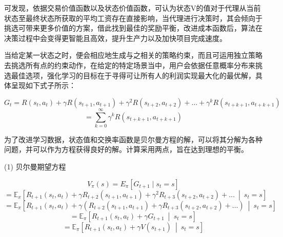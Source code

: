 可发现，依据交易价值函数以及状态价值函数，可认为状态V的值对于代理从当前状态至最终状态所获取的平均工资存在直接影响，当代理进行决策时，其会倾向于挑选可带来更多价值的方案，借此找到最佳的奖励平衡，改进成本函数后，算法在决策过程中会变得更智能且高效，提升生产力以及加快项目完成速度。

当给定某一状态之时，便会相应地生成与之相关的策略约束，而且可运用独立策略去挑选所有点的约束动作，在给定的特定场景当中，用户会依据任意概率分布来挑选最佳选项，强化学习的目标在于寻得可让所有人的利润实现最大化的最优解，具体呈现如下式子所示：

\begin{equation}
G_t = R(s_t, a_t) + \gamma R(s_{t+1}, a_{t+1}) + \gamma^2 R(s_{t+2}, a_{t+2}) + \ldots + \gamma^k R(s_{t+k+1}, a_{t+k+1})
\end{equation}
\begin{equation}
= \sum_{k=0}^\infty \gamma^k R(s_{t+k+1}, a_{t+k+1})
\end{equation}


为了改进学习数据，状态值和交换率函数是贝尔曼方程的解，可以将其分解为各种问题，并可以作为方程获得良好的解\cite{franccois2018introduction}。计算采用两点，旨在达到理想的平衡。

(1) 贝尔曼期望方程

\begin{equation}
V_{\pi}(s) = E_{\pi} \left[ G_{t+1} \mid s_{t} = s \right]
\end{equation}
\begin{equation}
= \mathbb{E}_x \left[ R_{t+1}(s_t, a_t) + \gamma R_{t+2}(s_{t+1}, a_{t+1}) + \gamma^2 R_{t+3}(s_{t+2}, a_{t+2}) + \ldots \ \middle| \ s_t = s \right]
\end{equation}
\begin{equation}
= \mathbb{E}_{\pi} \left[ R_{t+1}(s_t, a_t) + \gamma \left( R_{t+2}(s_{t+1}, a_{t+1}) + \gamma R_{t+3}(s_{t+2}, a_{t+2}) + \ldots \right) \ \middle| \ s_t = s \right]
\end{equation}
\begin{equation}
= \mathbb{E}_{\pi} \left[ R_{t+1}(s_t, a_t) + \gamma G_{t+1} \ \middle| \ s_t = s \right]
\end{equation}
\begin{equation}
= \mathbb{E}_{\pi} \left[ R_{t+1}(s_t, a_t) + \gamma V(s_{t+1}) \ \middle| \ s_t = s \right]
\end{equation}

